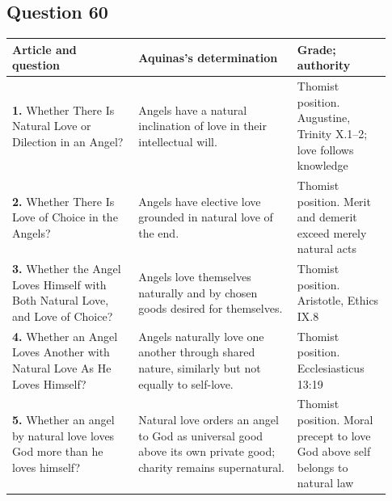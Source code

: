 \subsection{Question 60}
\begin{longtable}{@{}>{\raggedright\arraybackslash}p{0.31\linewidth}>{\raggedright\arraybackslash}p{0.39\linewidth}>{\raggedright\arraybackslash}p{0.23\linewidth}@{}}
\toprule
Article and question & Aquinas's determination & Grade; authority\\
\midrule\endhead
\textbf{1.} Whether There Is Natural Love or Dilection in an Angel? & Angels have a natural inclination of love in their intellectual will. & Thomist position. Augustine, Trinity X.1--2; love follows knowledge\\
\textbf{2.} Whether There Is Love of Choice in the Angels? & Angels have elective love grounded in natural love of the end. & Thomist position. Merit and demerit exceed merely natural acts\\
\textbf{3.} Whether the Angel Loves Himself with Both Natural Love, and Love of Choice? & Angels love themselves naturally and by chosen goods desired for themselves. & Thomist position. Aristotle, Ethics IX.8\\
\textbf{4.} Whether an Angel Loves Another with Natural Love As He Loves Himself? & Angels naturally love one another through shared nature, similarly but not equally to self-love. & Thomist position. Ecclesiasticus 13:19\\
\textbf{5.} Whether an angel by natural love loves God more than he loves himself? & Natural love orders an angel to God as universal good above its own private good; charity remains supernatural. & Thomist position. Moral precept to love God above self belongs to natural law\\
\bottomrule
\end{longtable}
